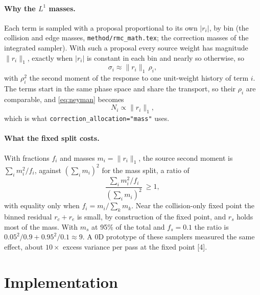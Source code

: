 \documentclass[11pt]{article}
\begin{document}
\paragraph{Why the $L^1$ masses.} Each term is sampled with a proposal proportional to
its own $|r_i|$, by bin (the collision and edge masses, \texttt{method/rmc\_math.tex}; the
correction masses of the integrated sampler). With such a proposal every source weight
has magnitude $\|r_i\|_1$, exactly when $|r_i|$ is constant in each bin and nearly so
otherwise, so
\begin{equation}
  \sigma_i \approx \|r_i\|_1\,\rho_i,
\end{equation}
with $\rho_i^2$ the second moment of the response to one unit-weight history of term
$i$. The terms start in the same phase space and share the transport, so their
$\rho_i$ are comparable, and \eqref{eq:neyman} becomes
\begin{equation}
  N_i \propto \|r_i\|_1 ,
\end{equation}
which is what \texttt{correction\_allocation="mass"} uses.

\paragraph{What the fixed split costs.} With fractions $f_i$ and masses $m_i =
\|r_i\|_1$, the source second moment is $\sum_i m_i^2/f_i$, against
$(\sum_i m_i)^2$ for the mass split, a ratio of
\begin{equation}
  \frac{\sum_i m_i^2/f_i}{(\sum_i m_i)^2}\ \ge 1 ,
\end{equation}
with equality only when $f_i = m_i/\sum_k m_k$. Near the collision-only fixed point the
binned residual $r_c + r_e$ is small, by construction of the fixed point, and $r_s$
holds most of the mass. With $m_s$ at 95\% of the total and $f_s = 0.1$ the ratio is
$0.05^2/0.9 + 0.95^2/0.1 \approx 9$. A 0D prototype of these samplers measured the same
effect, about $10\times$ excess variance per pass at the fixed point [4].

\section{Implementation}
\end{document}
